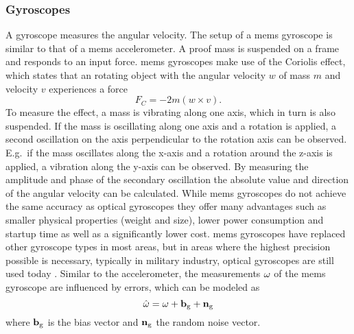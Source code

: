 \subsubsection{ Gyroscopes}
A gyroscope measures the angular velocity.
The setup of a \gls{mems} gyroscope is similar to that of a \gls{mems} accelerometer.
A proof mass is suspended on a frame and responds to an input force.
\gls{mems} gyroscopes make use of the Coriolis effect, which states that an rotating object with the angular velocity $w$ of mass $m$ and velocity $v$ experiences a force
\begin{equation}
	F_C = -2m(w\times v).
\end{equation}
To measure the effect, a mass is vibrating along one axis, which in turn is also suspended.
If the mass is oscillating along one axis and a rotation is applied, a second oscillation on the axis perpendicular to the rotation axis can be observed.
E.g.\ if the mass oscillates along the x-axis and a rotation around the z-axis is applied, a vibration along the y-axis can be observed.
By measuring the amplitude and phase of the secondary oscillation the absolute value and direction of the angular velocity can be calculated.
While \gls{mems} gyroscopes do not achieve the same accuracy as optical gyroscopes they offer many advantages such as smaller physical properties (weight and size), lower power consumption and startup time as well as a significantly lower cost.
\gls{mems} gyroscopes have replaced other gyroscope types in most areas, but in areas where the highest precision possible is necessary, typically in military industry, optical gyroscopes are still used today \cite{Perlmutter2016}.
Similar to the accelerometer, the measurements $\vb{\omega}$ of the \gls{mems} gyroscope are influenced by errors, which can be modeled as
\begin{equation}
	\hat{\vb{\omega}} = \vb{\omega} + \vb{b}_\mathrm{g} + \vb{n}_\mathrm{g}
\end{equation}
where $\vb{b}_\mathrm{g}$ is the bias vector and $\vb{n}_\mathrm{g}$ the random noise vector.

